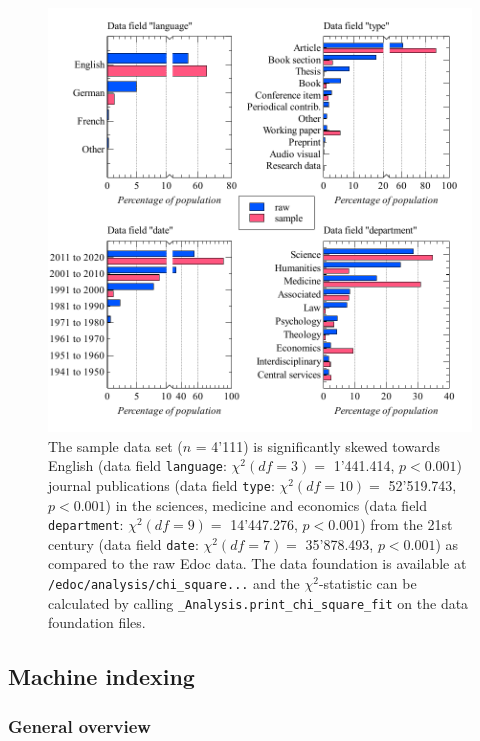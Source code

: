 \begin{figure}
\centering
\includegraphics{images/raw_sample_analysis.pdf}
\caption{The sample data set (\(n\) = 4'111) is significantly skewed
towards English (data field \texttt{language}: \(\chi^2 (df=3) =\)
1'441.414, \(p < 0.001\)) journal publications (data field
\texttt{type}: \(\chi^2 (df=10) =\) 52'519.743, \(p < 0.001\)) in the
sciences, medicine and economics (data field \texttt{department}:
\(\chi^2 (df=9) =\) 14'447.276, \(p < 0.001\)) from the 21st century
(data field \texttt{date}: \(\chi^2 (df=7) =\) 35'878.493,
\(p < 0.001\)) as compared to the raw Edoc data. The data foundation is
available at \texttt{/edoc/analysis/chi\_square...} and the
\(\chi^2\)-statistic can be calculated by calling
\texttt{\_Analysis.print\_chi\_square\_fit} on the data foundation
files.}
\end{figure}

\hypertarget{machine-indexing}{%
\subsection{Machine indexing}\label{machine-indexing}}

\hypertarget{general-overview}{%
\subsubsection{General overview}\label{general-overview}}

